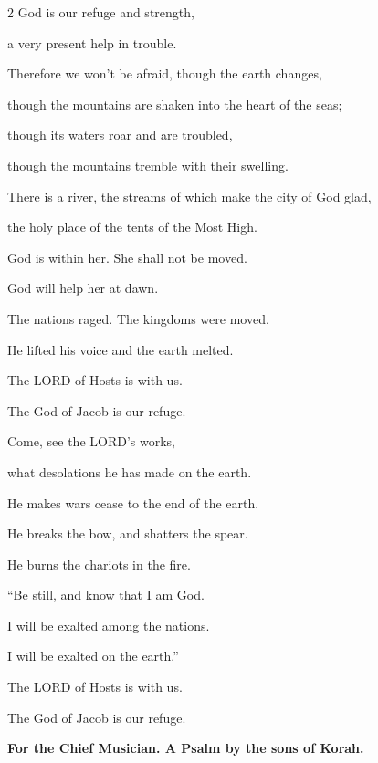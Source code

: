 \begin{multicols}{2}
	\myverse*{}God is our refuge and strength,
	
	a very present help in trouble.
	
	
	\myverse{}Therefore we won’t be afraid, though the earth changes,
	
	though the mountains are shaken into the heart of the seas;
	
	
	\myverse{}though its waters roar and are troubled,
	
	though the mountains tremble with their swelling.
	
	\vspace{\baselineskip}	
	
	
	\myverse{}There is a river, the streams of which make the city of God glad,
	
	the holy place of the tents of the Most High.
	
	
	\myverse{}God is within her. She shall not be moved.
	
	God will help her at dawn.
	
	
	\myverse{}The nations raged. The kingdoms were moved.
	
	He lifted his voice and the earth melted.
	
	
	\myverse{}The LORD of Hosts is with us.
	
	The God of Jacob is our refuge.
	
	\vspace{\baselineskip}
	
	
	
	\myverse{}Come, see the LORD’s works,
	
	what desolations he has made on the earth.
	
	
	\myverse{}He makes wars cease to the end of the earth.
	
	He breaks the bow, and shatters the spear.
	
	He burns the chariots in the fire.
	
	
	\myverse{}“Be still, and know that I am God.
	
	I will be exalted among the nations.
	
	I will be exalted on the earth.”
	
	
	\myverse{}The LORD of Hosts is with us.
	
	The God of Jacob is our refuge.
	
	
	
	
	\mychapter{}\textbf{For the Chief Musician. A Psalm by the sons of Korah.}
	

\end{multicols}

